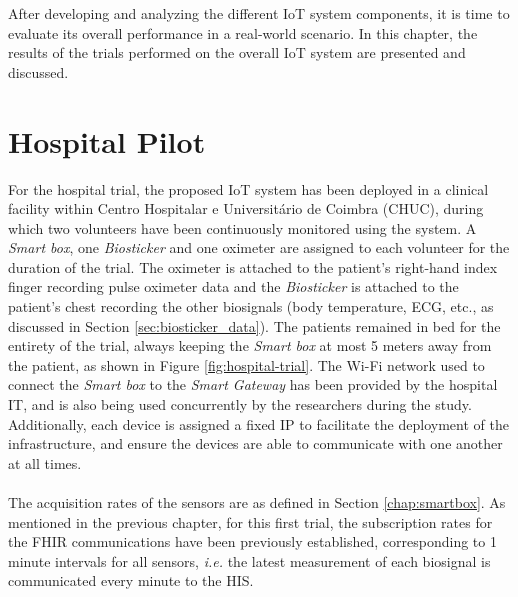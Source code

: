 

After developing and analyzing the different \acs{IoT} system components, it is time to evaluate its overall performance in a real-world scenario. In this chapter, the results of the trials performed on the overall \acs{IoT} system are presented and discussed. 

\paragraph{} 

\section{Hospital Pilot}

For the hospital trial, the proposed \acs{IoT} system has been deployed in a clinical facility within Centro Hospitalar e Universitário de Coimbra (CHUC), during which two volunteers have been continuously monitored using the system. A \textit{Smart box}, one \textit{Biosticker} and one oximeter are assigned to each volunteer for the duration of the trial. The oximeter is attached to the patient's right-hand index finger recording pulse oximeter data and the \textit{Biosticker} is attached to the patient's chest recording the other biosignals (body temperature, \acs{ECG}, etc., as discussed in Section \ref{sec:biosticker_data}). The patients remained in bed for the entirety of the trial, always keeping the \textit{Smart box} at most 5 meters away from the patient, as shown in Figure \ref{fig:hospital-trial}. The Wi-Fi network used to connect the \textit{Smart box} to the \textit{Smart Gateway} has been provided by the hospital IT, and is also being used concurrently by the researchers during the study. Additionally, each device is assigned a fixed \acs{IP} to facilitate the deployment of the infrastructure, and ensure the devices are able to communicate with one another at all times.

\paragraph{} The acquisition rates of the sensors are as defined in Section \ref{chap:smartbox}. As mentioned in the previous chapter, for this first trial, the subscription rates for the \acs{FHIR} communications have been previously established, corresponding to 1 minute intervals for all sensors, \textit{i.e.} the latest measurement of each biosignal is communicated every minute to the \acs{HIS}.


